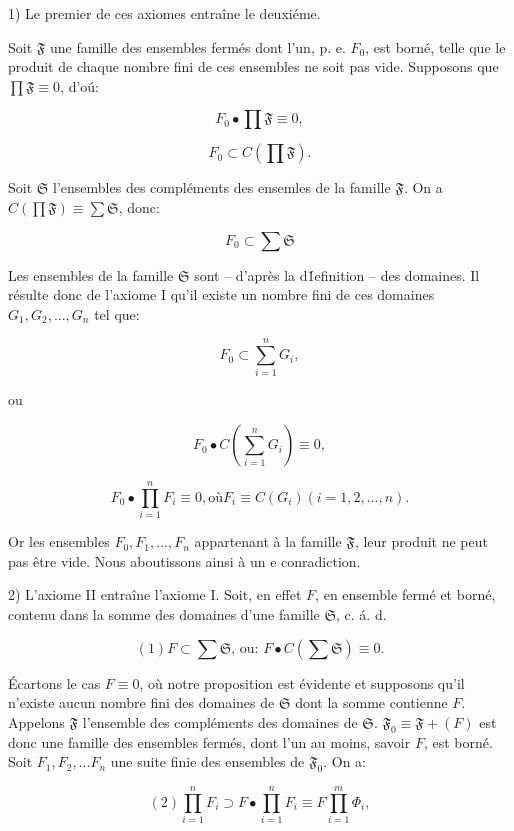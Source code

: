 \documentclass[12pt,french]{article}
\begin{document}
1) Le premier de ces axiomes entra\^ine le deuxi\'eme.

Soit $\mathfrak F$ une famille des ensembles ferm\'es dont l'un, p. e. $F_0$, est born\'e, telle que le produit de chaque nombre fini de ces ensembles ne soit pas vide. Supposons que $\prod \mathfrak{F} \equiv 0$, d'o\'u:

$$F_0 \bullet \prod \mathfrak{F} \equiv 0,$$

$$F_0 \subset C(\prod \mathfrak{F}).$$ \footnotemark

Soit $\mathfrak S$ l'ensembles des compl\'ements des ensemles de la famille $\mathfrak F$. On a $C(\prod \mathfrak{F}) \equiv \sum \mathfrak{S}$, donc:

$$F_0 \subset \sum \mathfrak{S}$$

Les ensembles de la famille $\mathfrak{S}$ sont -- d'apr\`es la d\'1efinition -- des domaines. Il r\'esulte donc de l'axiome I qu'il existe un nombre fini de ces domaines $G_1, G_2, ..., G_n$ tel que:

$$F_0 \subset \sum_{i=1}^{n}G_i,$$

ou

$$F_0 \bullet C(\sum_{i=1}^{n}G_i) \equiv 0,$$

$$F_0 \bullet \prod_{i=1}^{n}F_i \equiv 0, \mbox{o\`u} F_i \equiv C(G_i) (i=1,2,...,n).$$

Or les ensembles $F_0, F_1, ..., F_n$ appartenant \`a la famille $\mathfrak{F}$, leur produit ne peut pas \^etre vide. Nous aboutissons ainsi \`a un e conradiction.


2) L'axiome II entra\^ine l'axiome I. Soit, en effet $F$, en ensemble ferm\'e et born\'e, contenu dans la somme des domaines d'une famille $\mathfrak{S}$, c. \'a. d.

$$(1) F \subset \sum \mathfrak{S}\mbox{, ou: }F \bullet C(\sum \mathfrak{S}) \equiv 0.$$

\'Ecartons le cas $F \equiv 0$, o\`u notre proposition est \'evidente et supposons qu'il n'existe aucun nombre fini des domaines de $\mathfrak{S}$ dont la somme contienne $F$. Appelons $\mathfrak{F}$ l'ensemble des compl\'ements des domaines de $\mathfrak{S}$. $\mathfrak{F}_0 \equiv \mathfrak{F} + (F)$ est donc une famille des ensembles ferm\'es, dont l'un au moins, savoir $F$, est born\'e. Soit $F_1, F_2, ...F_n$ une suite finie des ensembles de $\mathfrak{F}_0$. On a:

$$(2) \prod_{i=1}^{n} F_i \supset F \bullet \prod_{i=1}^{n}F_i \equiv F \prod_{i=1}^{m}\Phi_i,$$
\end{document}
